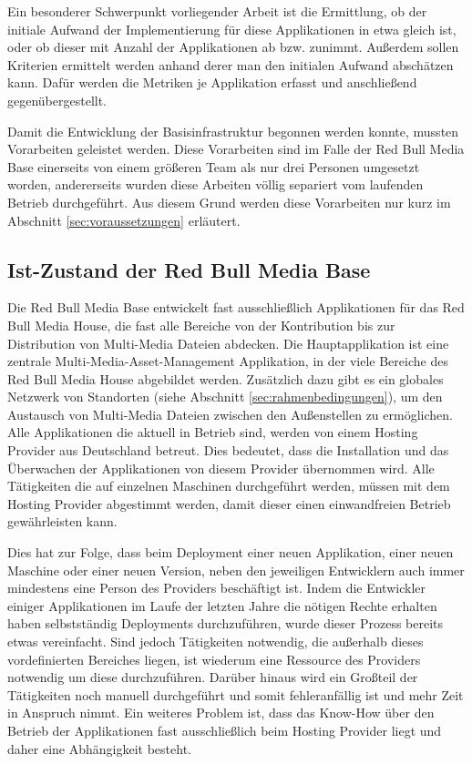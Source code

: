 Ein besonderer Schwerpunkt vorliegender Arbeit ist die Ermittlung, ob der initiale Aufwand der Implementierung für diese Applikationen in etwa gleich ist, oder ob dieser mit Anzahl der Applikationen ab bzw. zunimmt. Außerdem sollen Kriterien ermittelt werden anhand derer man den initialen Aufwand abschätzen kann. Dafür werden die Metriken je Applikation erfasst und anschließend gegenübergestellt.

Damit die Entwicklung der Basisinfrastruktur begonnen werden konnte, mussten Vorarbeiten geleistet werden. Diese Vorarbeiten sind im Falle der Red Bull Media Base einerseits von einem größeren Team als nur drei Personen umgesetzt worden, andererseits wurden diese Arbeiten völlig separiert vom laufenden Betrieb durchgeführt. Aus diesem Grund werden diese Vorarbeiten nur kurz im Abschnitt \ref{sec:voraussetzungen} erläutert.

\subsection{Ist-Zustand der Red Bull Media Base}
\label{sec:istzustand}
Die Red Bull Media Base entwickelt fast ausschließlich Applikationen für das Red Bull Media House, die fast alle Bereiche von der Kontribution bis zur Distribution von Multi-Media Dateien abdecken. Die Hauptapplikation ist eine zentrale Multi-Media-Asset-Management Applikation, in der viele Bereiche des Red Bull Media House abgebildet werden. Zusätzlich dazu gibt es ein globales Netzwerk von Standorten (siehe Abschnitt \ref{sec:rahmenbedingungen}), um den Austausch von Multi-Media Dateien zwischen den Außenstellen zu ermöglichen. Alle Applikationen die aktuell in Betrieb sind, werden von einem Hosting Provider aus Deutschland betreut. Dies bedeutet, dass die Installation und das Überwachen der Applikationen von diesem Provider übernommen wird. Alle Tätigkeiten die auf einzelnen Maschinen durchgeführt werden, müssen mit dem Hosting Provider abgestimmt werden, damit dieser einen einwandfreien Betrieb gewährleisten kann.

Dies hat zur Folge, dass beim Deployment einer neuen Applikation, einer neuen Maschine oder einer neuen Version, neben den jeweiligen Entwicklern auch immer mindestens eine Person des Providers beschäftigt ist. Indem die Entwickler einiger Applikationen im Laufe der letzten Jahre die nötigen Rechte erhalten haben selbstständig Deployments durchzuführen, wurde dieser Prozess bereits etwas vereinfacht. Sind jedoch Tätigkeiten notwendig, die außerhalb dieses vordefinierten Bereiches liegen, ist wiederum eine Ressource des Providers notwendig um diese durchzuführen. Darüber hinaus wird ein Großteil der Tätigkeiten noch manuell durchgeführt und somit fehleranfällig ist und mehr Zeit in Anspruch nimmt. Ein weiteres Problem ist, dass das Know-How über den Betrieb der Applikationen fast ausschließlich beim Hosting Provider liegt und daher eine Abhängigkeit besteht.

